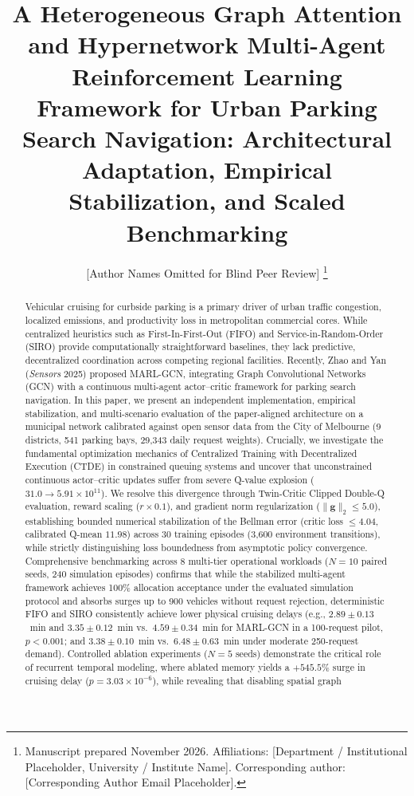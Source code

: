 \documentclass[journal]{IEEEtran}
\begin{document}
\title{A Heterogeneous Graph Attention and Hypernetwork Multi-Agent Reinforcement Learning Framework for Urban Parking Search Navigation: Architectural Adaptation, Empirical Stabilization, and Scaled Benchmarking}

\author{[Author Names Omitted for Blind Peer Review]%
\thanks{Manuscript prepared November 2026. Affiliations: [Department / Institutional Placeholder, University / Institute Name]. Corresponding author: [Corresponding Author Email Placeholder].}}

\maketitle

\begin{abstract}
Vehicular cruising for curbside parking is a primary driver of urban traffic congestion, localized emissions, and productivity loss in metropolitan commercial cores. While centralized heuristics such as First-In-First-Out (FIFO) and Service-in-Random-Order (SIRO) provide computationally straightforward baselines, they lack predictive, decentralized coordination across competing regional facilities. Recently, Zhao and Yan (\textit{Sensors} 2025) proposed MARL-GCN, integrating Graph Convolutional Networks (GCN) with a continuous multi-agent actor--critic framework for parking search navigation. In this paper, we present an independent implementation, empirical stabilization, and multi-scenario evaluation of the paper-aligned architecture on a municipal network calibrated against open sensor data from the City of Melbourne (9 districts, 541 parking bays, 29,343 daily request weights). Crucially, we investigate the fundamental optimization mechanics of Centralized Training with Decentralized Execution (CTDE) in constrained queuing systems and uncover that unconstrained continuous actor--critic updates suffer from severe Q-value explosion ($31.0 \to 5.91 \times 10^{11}$). We resolve this divergence through Twin-Critic Clipped Double-Q evaluation, reward scaling ($r \times 0.1$), and gradient norm regularization ($\|\mathbf{g}\|_2 \le 5.0$), establishing bounded numerical stabilization of the Bellman error (critic loss $\le 4.04$, calibrated Q-mean $11.98$) across 30 training episodes (3,600 environment transitions), while strictly distinguishing loss boundedness from asymptotic policy convergence. Comprehensive benchmarking across 8 multi-tier operational workloads ($N=10$ paired seeds, 240 simulation episodes) confirms that while the stabilized multi-agent framework achieves 100\% allocation acceptance under the evaluated simulation protocol and absorbs surges up to 900 vehicles without request rejection, deterministic FIFO and SIRO consistently achieve lower physical cruising delays (e.g., $2.89 \pm 0.13$~min and $3.35 \pm 0.12$~min vs.\ $4.59 \pm 0.34$~min for MARL-GCN in a 100-request pilot, $p < 0.001$; and $3.38 \pm 0.10$~min vs.\ $6.48 \pm 0.63$~min under moderate 250-request demand). Controlled ablation experiments ($N=5$ seeds) demonstrate the critical role of recurrent temporal modeling, where ablated memory yields a $+545.5\%$ surge in cruising delay ($p = 3.03 \times 10^{-6}$), while revealing that disabling spatial graph 
\end{abstract}
\end{document}
